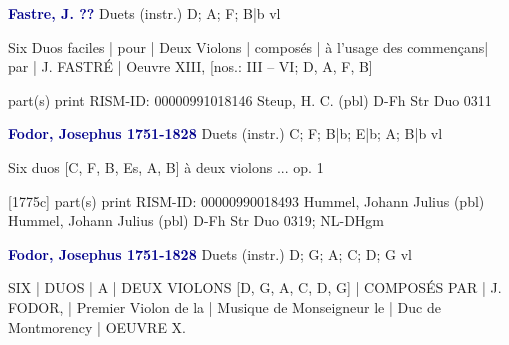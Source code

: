 \documentclass[twocolumn]{book}
\begin{document}
\newline \par \vspace{7pt} \textcolor{darkblue}{\textbf{Fastre, J.  ??}}
\newline Duets (instr.)  D; A; F; B|b  
 vl
\newline \begin{itshape}Six Duos faciles | pour | Deux Violons | composés | à l'usage des commençans| par | J. FASTRÉ | Oeuvre XIII, [nos.: III – VI; D, A, F, B]\end{itshape} 
\newline \textcolor{darkblue}{}  part(s)  
\newline print
\newline RISM-ID: 00000991018146
\newline Steup, H. C.  (pbl)
\newline D-Fh  Str Duo 0311
\newline \par \vspace{7pt} \textcolor{darkblue}{\textbf{Fodor, Josephus  1751-1828}}
\newline Duets (instr.)  C; F; B|b; E|b; A; B|b  
 vl
\newline \begin{itshape}Six duos [C, F, B, Es, A, B] à deux violons ... op. 1\end{itshape} 
\newline \textcolor{darkblue}{}  [1775c]  part(s)  
\newline print
\newline RISM-ID: 00000990018493
\newline Hummel, Johann Julius  (pbl)
\newline Hummel, Johann Julius  (pbl)
\newline D-Fh  Str Duo 0319; NL-DHgm
\newline \par \vspace{7pt} \textcolor{darkblue}{\textbf{Fodor, Josephus  1751-1828}}
\newline Duets (instr.)  D; G; A; C; D; G  
 vl
\newline \begin{itshape}SIX | DUOS | A | DEUX VIOLONS [D, G, A, C, D, G] | COMPOSÉS PAR | J. FODOR, | Premier Violon de la | Musique de Monseigneur le | Duc de Montmorency | OEUVRE X.\end{itshape} 
\end{document}
